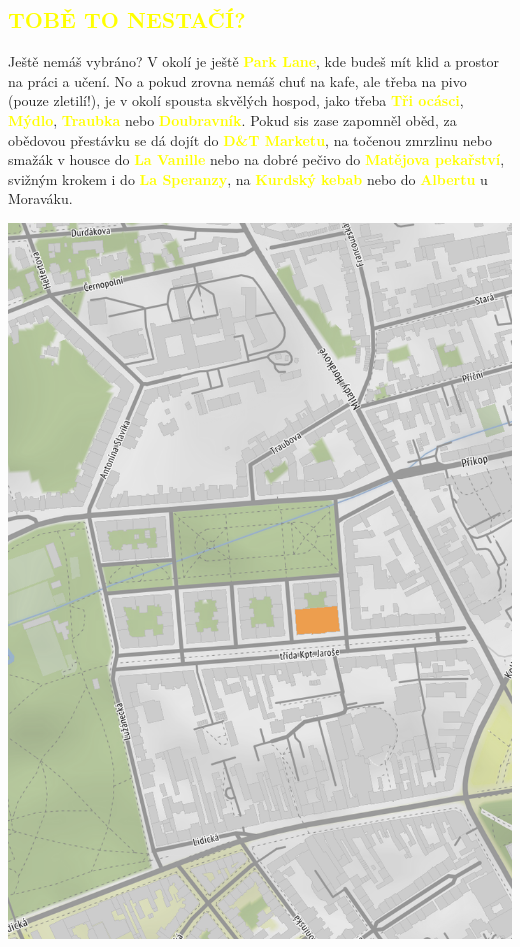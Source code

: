 \documentclass[a5paper, twoside]{article}
\newcommand{\podnadpis}[2]{
  \subsection*{\textcolor{#2}{#1}}
}
\begin{document}
\podnadpis{TOBĚ TO NESTAČÍ?}{yellow}
Ještě nemáš vybráno? V okolí je ještě \textcolor{yellow}{\textbf{Park Lane}}, kde budeš mít klid a prostor na práci a učení. No a pokud zrovna nemáš chuť na kafe, ale třeba na pivo (pouze zletilí!), je v okolí spousta skvělých hospod, jako třeba \textcolor{yellow}{\textbf{Tři ocásci}}, \textcolor{yellow}{\textbf{Mýdlo}}, \textcolor{yellow}{\textbf{Traubka}} nebo \textcolor{yellow}{\textbf{Doubravník}}. Pokud sis zase zapomněl oběd, za obědovou přestávku se dá dojít do \textcolor{yellow}{\textbf{D\&T Marketu}}, na točenou zmrzlinu nebo smažák v housce do \textcolor{yellow}{\textbf{La Vanille}} nebo na dobré pečivo do \textcolor{yellow}{\textbf{Matějova pekařství}}, svižným krokem i do \textcolor{yellow}{\textbf{La Speranzy}}, na \textcolor{yellow}{\textbf{Kurdský kebab}} nebo do \textcolor{yellow}{\textbf{Albertu}} u Moraváku.

\pagebreak
\begin{landscape}


\hspace*{-44pt}\vspace*{-150pt}
\noindent\includegraphics[width=0.95\linewidth]{mapa.png}
\restoregeometry
\end{landscape}
\pagebreak
\end{document}

